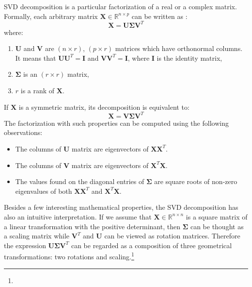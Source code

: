 \begin{appendices}
SVD decomposition is a particular factorization of a real or a complex matrix. Formally, each arbitrary matrix $\boldsymbol{X} \in \mathbb{R}^{n \times p}$ can be written as \citep{Jolliffe}:
\begin{equation}
    \boldsymbol{X}=\boldsymbol{U}\boldsymbol{\Sigma}{\boldsymbol{V}^T}
\end{equation}
where:
\begin{enumerate}
    \item $\boldsymbol{U}$ and $\boldsymbol{V}$ are $(n \times r)$, $(p \times r)$ matrices which have orthonormal columns. It means that $\boldsymbol{U}\boldsymbol{U}^T=\boldsymbol{I}$ and $\boldsymbol{V}\boldsymbol{V}^T=\boldsymbol{I}$, where $\boldsymbol{I}$ is the identity matrix,
    \item $\boldsymbol{\Sigma}$ is an $(r \times r)$ matrix,
    \item $r$ is a rank of $\boldsymbol{X}$.
\end{enumerate}
If $\boldsymbol{X}$ is a symmetric matrix, its decomposition is equivalent to:
\begin{equation}
    \boldsymbol{X}=\boldsymbol{V}\boldsymbol{\Sigma}{\boldsymbol{V}^T}
\end{equation}
The factorization with such properties can be computed using the following observations:
\begin{itemize}
    \item The columns of $\boldsymbol{U}$ matrix are eigenvectors of $\boldsymbol{X}\boldsymbol{X}^T$.
    \item The columns of $\boldsymbol{V}$ matrix are eigenvectors of $\boldsymbol{X}^T\boldsymbol{X}$.
    \item The values found on the diagonal entries of $\boldsymbol{\Sigma}$ are square roots of non-zero eigenvalues of both $\boldsymbol{X}\boldsymbol{X}^T$ and $\boldsymbol{X}^T\boldsymbol{X}$.
\end{itemize}

Besides a few interesting mathematical properties, the SVD decomposition has also an intuitive interpretation. If we assume that $\boldsymbol{X} \in \mathbb{R}^{n \times n}$ is a square matrix of a linear transformation with the positive determinant, then $\boldsymbol{\Sigma}$ can be thought as a scaling matrix while $\boldsymbol{V}^T$ and $\boldsymbol{U}$ can be viewed as rotation matrices. Therefore the expression $\boldsymbol{U}\boldsymbol{\Sigma}{\boldsymbol{V}^T}$ can be regarded as a composition of three geometrical transformations: two rotations and scaling.\footnote{}


\end{appendices}
